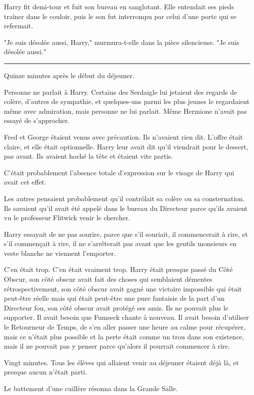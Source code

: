 Harry fit demi-tour et fuit son bureau en sanglotant. Elle entendait ses pieds traîner dans le couloir, puis le son fut interrompu par celui d'une porte qui se refermait.

"Je suis désolée aussi, Harry," murmura-t-elle dans la pièce silencieuse. "Je suis désolée aussi."
\par\noindent\rule{\textwidth}{0.4pt}
Quinze minutes après le début du déjeuner.

Personne ne parlait à Harry. Certains des Serdaigle lui jetaient des regards de colère, d'autres de sympathie, et quelques-uns parmi les plus jeunes le regardaient même avec admiration, mais personne ne lui parlait. Même Hermione n'avait pas essayé de s'approcher.

Fred et George étaient venus avec précaution. Ils n'avaient rien dit. L'offre était claire, et elle était optionnelle. Harry leur avait dit qu'il viendrait pour le dessert, pas avant. Ils avaient hoché la tête et étaient vite partis.

C'était probablement l'absence totale d'expression sur le visage de Harry qui avait cet effet.

Les autres pensaient probablement qu'il contrôlait sa colère ou sa consternation. Ils savaient qu'il avait été appelé dans le bureau du Directeur parce qu'ils avaient vu le professeur Flitwick venir le chercher.

Harry essayait de ne pas sourire, parce que s'il souriait, il commencerait à rire, et s'il commençait à rire, il ne s'arrêterait pas avant que les gentils monsieurs en veste blanche ne viennent l'emporter.

C'en était trop. C'en était vraiment trop. Harry était presque passé du Côté Obscur, son côté obscur avait fait des choses qui semblaient démentes rétrospectivement, son côté obscur avait gagné une victoire impossible qui était peut-être réelle mais qui était peut-être une pure fantaisie de la part d'un Directeur fou, son côté obscur avait protégé ses amis. Ils ne pouvait plus le supporter. Il avait besoin que Fumseck chante à nouveau. Il avait besoin d'utiliser le Retourneur de Temps, de s'en aller passer une heure au calme pour récupérer, mais ce n'était plus possible et la perte était comme un trou dans son existence, mais il ne pouvait pas y penser parce qu'alors il pourrait commencer à rire.

Vingt minutes. Tous les élèves qui allaient venir au déjeuner étaient déjà là, et presque aucun n'était parti.

Le battement d'une cuillère résonna dans la Grande Salle.

